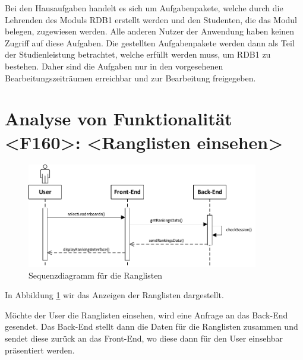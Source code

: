Bei den Hausaufgaben handelt es sich um Aufgabenpakete, welche durch die Lehrenden des Moduls RDB1 erstellt werden und den Studenten, die das Modul belegen, zugewiesen werden. Alle anderen Nutzer der Anwendung haben keinen Zugriff auf diese Aufgaben. Die gestellten Aufgabenpakete werden dann als Teil der Studienleistung betrachtet, welche erfüllt werden muss, um RDB1 zu bestehen. Daher sind die Aufgaben nur in den vorgesehenen Bearbeitungszeiträumen erreichbar und zur Bearbeitung freigegeben. 

\section{Analyse von Funktionalität <F160>: <Ranglisten einsehen>}
\begin{figure}[h]
\centering
\includegraphics[width=0.9\textwidth]{figures/sequenz_F160.pdf}
\caption{Sequenzdiagramm für die Ranglisten}
\label{sequence_f160}
\end{figure}
In Abbildung \ref{sequence_f160} wir das Anzeigen der Ranglisten dargestellt.

Möchte der User die Ranglisten einsehen, wird eine Anfrage an das Back-End gesendet. Das Back-End stellt dann die Daten für die Ranglisten zusammen und sendet diese zurück an das Front-End, wo diese dann für den User einsehbar präsentiert werden.

\newpage
